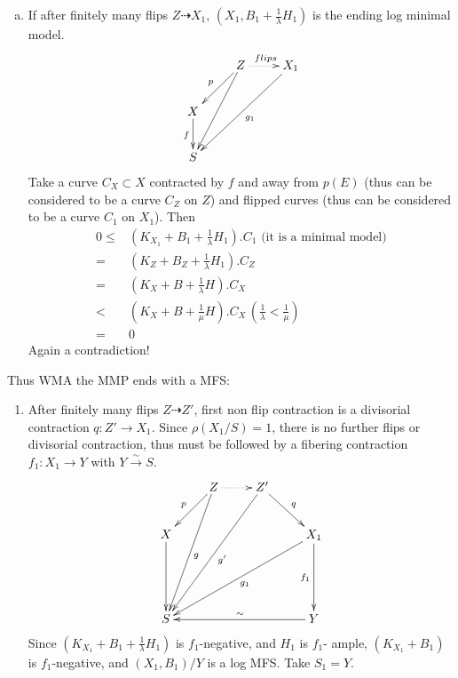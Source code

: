 \documentclass{article}
\begin{document}
\begin{enumerate}[(A)]
\begin{enumerate}[a)]
\begin{equation*}
\begin{aligned}
        \leqslant &(K_{Z}+B_{Z}+\frac{1}{\lambda}H_1).C_{Z}\\
        =&(K_X+B+\frac{1}{\lambda}H).C_X\\
        <&(K_{X}+B+\frac{1}{\mu}H).C_X  \,(\frac{1}{\lambda}<\frac{1}{\mu})\\
        =&0
      \end{aligned}
    \end{equation*}
    Contraction!
  \item If after finitely many flips $ Z\dashrightarrow X_1 $,  $ (X_1,B_1+\frac{1}{\lambda}H_1) $ is the ending log minimal model.
    $$ \xymatrix{
      &Z\ar[ld]_p\ar[ldd]\ar@{.>}[r]^{flips}&X_1\ar[lldd]^{g_1}\\
      X\ar[d]_f&&\\
    S &&}$$
    Take a curve $ C_X\subset X $ contracted by $ f $ and away from $ p(E) $ (thus can be considered to be a curve $ C_Z $ on $ Z $) and flipped curves (thus can be considered to be a curve $ C_{1} $ on $X_1$). Then
    \begin{equation*}
      \begin{aligned}
        0\leqslant& (K_{X_1}+B_1+\frac{1}{\lambda}H_1).C_1 \text{ (it is a minimal model)}\\
        =&(K_{Z}+B_{Z}+\frac{1}{\lambda}H_1).C_{Z}\\
        = &(K_X+B+\frac{1}{\lambda}H).C_X\\
        <&(K_{X}+B+\frac{1}{\mu}H).C_X  \,(\frac{1}{\lambda}<\frac{1}{\mu})\\
        =&0
      \end{aligned}
    \end{equation*}
    Again  a contradiction!
\end{enumerate}
Thus WMA the MMP ends with a MFS:
\begin{enumerate}[1)]
\item After finitely many flips $ Z\dashrightarrow Z' $, first non flip contraction is a divisorial contraction $ q:Z'\to X_1 $. Since $ \rho(X_1/S)=1 $, there is no further flips or divisorial contraction, thus must be followed by a fibering contraction $ f_1:X_1\to Y $ with $ Y\xrightarrow{\sim}S $.
  $$ \xymatrix{
    &Z\ar[lddd]^g\ar[ld]_p\ar@{.>}[r]&Z'\ar[dr]^{q}\ar[llddd]^{g'}&\\
    X\ar[dd]&&&X_1\ar[dd]_{f_1}\ar[ddlll]^{g_1}\\
    &&&\\
  S&&&Y\ar[lll]_{\sim}} $$
  Since $ (K_{X_1}+B_1+\frac{1}{\lambda}H_1) $ is $ f_1 $-negative, and $ H_1 $ is $ f_1 $- ample, $ (K_{X_1}+B_1) $ is $ f_1 $-negative, and $ (X_1,B_1)/Y $ is a log MFS.  Take $ S_1=Y $.


\end{enumerate}
\end{enumerate}
\end{document}
